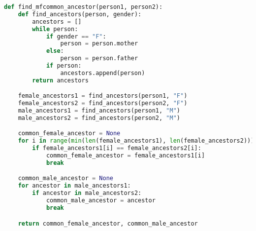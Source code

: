 \begin{lstlisting}[language=Python]
def find_mfcommon_ancestor(person1, person2):
    def find_ancestors(person, gender):
        ancestors = []
        while person:
            if gender == "F":
                person = person.mother
            else:
                person = person.father
            if person:
                ancestors.append(person)
        return ancestors

    female_ancestors1 = find_ancestors(person1, "F")
    female_ancestors2 = find_ancestors(person2, "F")
    male_ancestors1 = find_ancestors(person1, "M")
    male_ancestors2 = find_ancestors(person2, "M")

    common_female_ancestor = None
    for i in range(min(len(female_ancestors1), len(female_ancestors2))):
        if female_ancestors1[i] == female_ancestors2[i]:
            common_female_ancestor = female_ancestors1[i]
            break

    common_male_ancestor = None
    for ancestor in male_ancestors1:
        if ancestor in male_ancestors2:
            common_male_ancestor = ancestor
            break

    return common_female_ancestor, common_male_ancestor
\end{lstlisting}
\begin{lstlisting}[language=Python]

\end{lstlisting}
